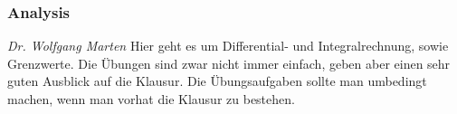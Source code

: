 
\subsubsection{Analysis}
	\textit{Dr. Wolfgang Marten}
	Hier geht es um Differential- und Integralrechnung, sowie Grenzwerte. Die Übungen sind zwar nicht immer einfach, geben aber einen sehr guten Ausblick auf die Klausur. Die Übungsaufgaben sollte man umbedingt machen, wenn man vorhat die Klausur zu bestehen.